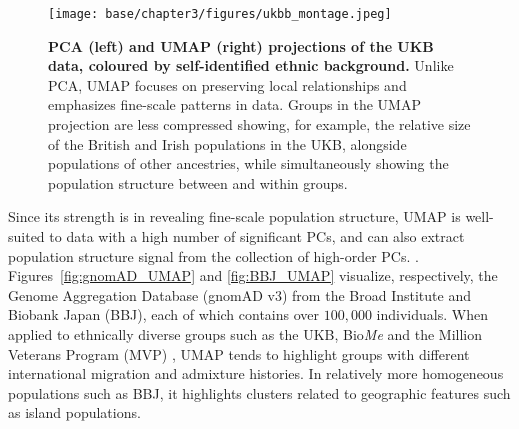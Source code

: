\begin{figure}[h]
  \centering
    \texttt{[image: base/chapter3/figures/ukbb\_montage.jpeg]}
  \caption[PCA compared to UMAP of the UKB]{\textbf{PCA (left) and UMAP (right) projections of the UKB data, coloured by self-identified ethnic background.} Unlike PCA, UMAP focuses on preserving local relationships and emphasizes fine-scale patterns in data. Groups in the UMAP projection are less compressed showing, for example, the relative size of the British and Irish populations in the UKB, alongside populations of other ancestries, while simultaneously showing the population structure between and within groups.}
  \label{fig:UKB}
\end{figure}

Since its strength is in revealing fine-scale population structure, UMAP is well-suited to data with a high number of significant PCs, and can also extract population structure signal from the collection of high-order PCs. \citep{diaz-papkovich_umap_2019}.  Figures~\ref{fig:gnomAD_UMAP} and \ref{fig:BBJ_UMAP} visualize, respectively, the Genome Aggregation Database (gnomAD v3) from the Broad Institute\citep{karczewski_mutational_2020} and Biobank Japan (BBJ)\citep{nagai2017overview,sakaue_dimensionality_2020}, each of which contains over $100,000$ individuals. When applied to ethnically diverse groups such as the UKB, Bio\textit{Me}\citep{belbin_towards_2019} and the Million Veterans Program (MVP) \citep{hunter-zinck_genotyping_2020}, UMAP tends to highlight groups with different international migration and admixture histories. In relatively more homogeneous populations such as BBJ, it highlights clusters related to geographic features such as island populations.

